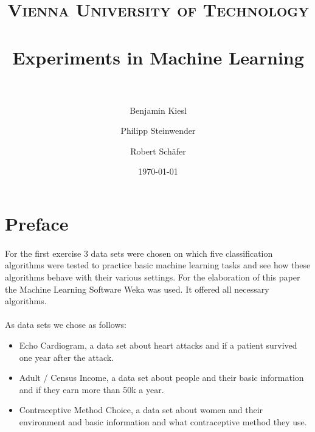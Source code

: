 \documentclass[paper=a4, fontsize=11pt]{scrartcl} %
\title{ 
\normalfont \normalsize 
\textsc{Vienna University of Technology} \\ [25pt] %
\horrule{0.5pt} \\[0.4cm] %
\huge Experiments in Machine Learning \\ %
\horrule{2pt} \\[0.5cm] %
}
\author{Benjamin Kiesl \and Philipp Steinwender \and Robert Sch\"{a}fer} %
\date{\normalsize\today} %
\numberwithin{equation}{section} %
\numberwithin{figure}{section} %
\numberwithin{table}{section} %
\begin{document}
\maketitle %




\section{Preface}

\paragraph{}For the first exercise 3 data sets were chosen on which five classification algorithms were tested to practice basic machine learning tasks and see how these algorithms behave with their various settings. For the elaboration of this paper the Machine Learning Software Weka was used. It offered all necessary algorithms.

\paragraph{}As data sets we chose as follows:
\begin{itemize}
\item Echo Cardiogram, a data set about heart attacks and if a patient survived one year after the attack.
\item Adult / Census Income, a data set about people and their basic information and if they earn more than 50k a year.
\item Contraceptive Method Choice, a data set about women and their environment and basic information and what contraceptive method they use.
\end{itemize}
\end{document}
